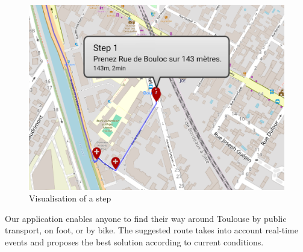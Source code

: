 \begin{figure}[h]
    \centering
    \includegraphics[scale=0.2]{img/step_cut.png}
    \caption{Visualisation of a step}
    \label{fig:StepVisualisation}
\end{figure}


Our application enables anyone to find their way around Toulouse by public transport, on foot, or by bike. The suggested route takes into account real-time events and proposes the best solution according to current conditions.
